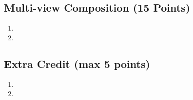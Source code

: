 \documentclass[
]{article}
\providecommand{\tightlist}{%
  \setlength{\itemsep}{0pt}\setlength{\parskip}{0pt}}\usepackage{longtable,booktabs,array}
\begin{document}
\subsection{Multi-view Composition (15
Points)}\label{multi-view-composition-15-points}

\begin{enumerate}
\def\labelenumi{\arabic{enumi}.}
\tightlist
\item
\item
\end{enumerate}

\subsection{Extra Credit (max 5
points)}\label{extra-credit-max-5-points}

\begin{enumerate}
\def\labelenumi{\arabic{enumi}.}
\tightlist
\item
\item
\end{enumerate}
\end{document}
